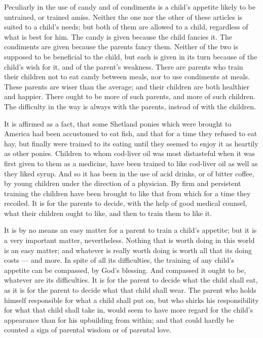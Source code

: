 \documentclass[
]{book}
\begin{document}
Peculiarly in the use of candy and of condiments is a child's appetite likely to be untrained, or trained amiss. Neither the one nor the other of these articles is suited to a child's needs; but both of them are allowed to a child, regardless of what is best for him. The candy is given because the child fancies it. The condiments are given because the parents fancy them. Neither of the two is supposed to be beneficial to the child, but each is given in its turn because of the child's wish for it, and of the parent's weakness. There are parents who train their children not to eat candy between meals, nor to use condiments at meals. These parents are wiser than the average; and their children are both healthier and happier. There ought to be more of such parents, and more of such children. The difficulty in the way is always with the parents, instead of with the children.

It is affirmed as a fact, that some Shetland ponies which were brought to America had been accustomed to eat fish, and that for a time they refused to eat hay, but finally were trained to its eating until they seemed to enjoy it as heartily as other ponies. Children to whom cod-liver oil was most distasteful when it was first given to them as a medicine, have been trained to like cod-liver oil as well as they liked syrup. And so it has been in the use of acid drinks, or of bitter coffee, by young children under the direction of a physician. By firm and persistent training the children have been brought to like that from which for a time they recoiled. It is for the parents to decide, with the help of good medical counsel, what their children ought to like, and then to train them to like it.

It is by no means an easy matter for a parent to train a child's appetite; but it is a very important matter, nevertheless. Nothing that is worth doing in this world is an easy matter; and whatever is really worth doing is worth all that its doing costs --- and more. In spite of all its difficulties, the training of any child's appetite can be compassed, by God's blessing. And compassed it ought to be, whatever are its difficulties. It is for the parent to decide what the child shall eat, as it is for the parent to decide what that child shall wear. The parent who holds himself responsible for what a child shall put on, but who shirks his responsibility for what that child shall take in, would seem to have more regard for the child's appearance than for his upbuilding from within; and that could hardly be counted a sign of parental wisdom or of parental love.
\end{document}
